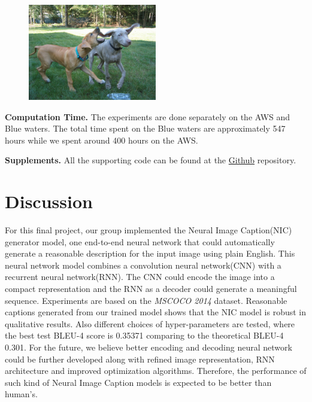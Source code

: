 \documentclass[fleqn,10pt]{SelfArx} %
\begin{document}
\begin{figure}[H]
\centering
\includegraphics[width=0.5\textwidth]{dogs.png}
\end{figure}




\textbf{Computation Time.} The experiments are done separately on the AWS and Blue waters. The total time spent on the Blue waters are approximately 547 hours while we spent around 400 hours on the AWS.

\textbf{Supplements.} All the supporting code can be found at the \href{https://github.com/Rothdyt/Projects/tree/master/Show-and-tell}{Github} repository.


\section{Discussion}
For this final project, our group implemented the Neural Image Caption(NIC) generator model, one end-to-end neural network that could automatically generate a reasonable description for the input image using plain English. This neural network model combines a convolution neural network(CNN) with a recurrent neural network(RNN). The CNN could encode the image into a compact representation and the RNN as a decoder could generate a  meaningful sequence. Experiments are based on the \textit{MSCOCO 2014} dataset. Reasonable captions generated from our trained model shows that the NIC model is robust in qualitative results. Also different choices of hyper-parameters are tested, where the best test BLEU-4 score is 0.35371 comparing to the theoretical BLEU-4 0.301. For the future, we believe better encoding and decoding neural network could be further developed along with  refined image representation, RNN architecture and improved optimization algorithms. Therefore, the performance of such kind of Neural Image Caption models is expected to be better than human's.

\end{document}
